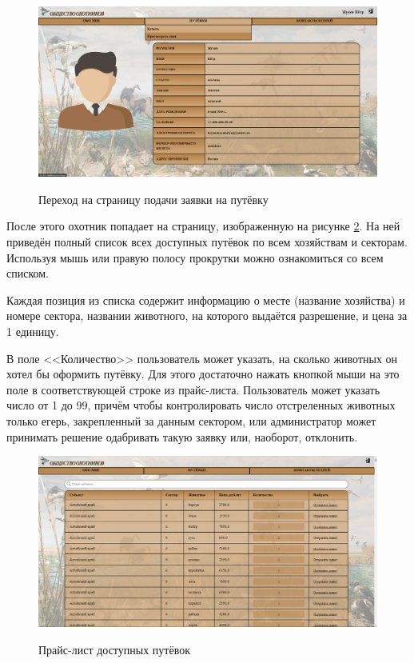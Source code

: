 	\begin{figure}[h]
		\centering
		\begin{center}
			{\includegraphics[scale=0.34]{schemes/screens/start.png}}
			\caption{Переход на страницу подачи заявки на путёвку}
			\label{fig10:image}
		\end{center}
	\end{figure}

	После этого охотник попадает на страницу, изображенную на рисунке \ref{fig11:image}. На ней приведён полный список всех доступных путёвок по всем хозяйствам и секторам. Используя мышь или правую полосу прокрутки можно ознакомиться со всем списком. 
	
	Каждая позиция из списка содержит информацию о месте (название хозяйства) и номере сектора, названии животного, на которого выдаётся разрешение, и цена за 1 единицу. 
	
	В поле <<Количество>> пользователь может указать, на сколько животных он хотел бы оформить путёвку. Для этого достаточно нажать кнопкой мыши на это поле в соответствующей строке из прайс-листа. Пользователь может указать число от 1 до 99, причём чтобы контролировать число отстреленных животных только егерь, закрепленный за данным сектором, или администратор может принимать решение одабривать такую заявку или, наоборот, отклонить. 
	
	\begin{figure}[h]
		\centering
		\begin{center}
			{\includegraphics[scale=0.34]{schemes/screens/menu.png}}
			\caption{Прайс-лист доступных путёвок}
			\label{fig11:image}
		\end{center}
	\end{figure}

